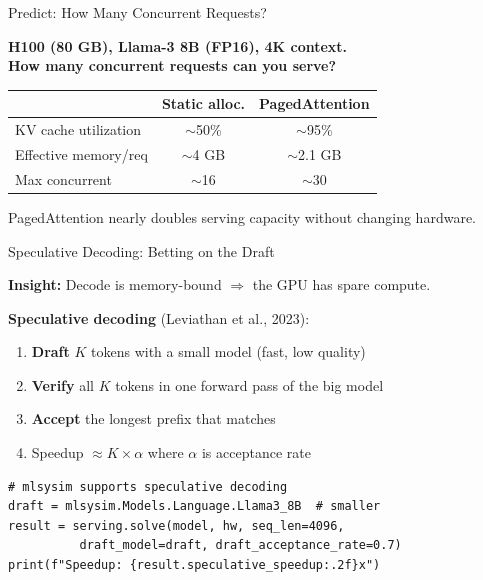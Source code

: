 \documentclass[aspectratio=169, 12pt]{beamer}
\begin{document}
\begin{frame}{Predict: How Many Concurrent Requests?}

\centering
\Large\bfseries
H100 (80 GB), Llama-3 8B (FP16), 4K context.\\[0.5cm]
\normalsize
How many concurrent requests can you serve?\\[0.3cm]

\pause

\small
\begin{tabular}{lcc}
\toprule
  & \textbf{Static alloc.} & \textbf{PagedAttention} \\
\midrule
KV cache utilization & $\sim$50\% & $\sim$95\% \\
Effective memory/req & $\sim$4 GB & $\sim$2.1 GB \\
Max concurrent & $\sim$16 & $\sim$30 \\
\bottomrule
\end{tabular}

\vspace{0.3cm}
\pause
\alert{PagedAttention nearly doubles serving capacity without changing hardware.}
\end{frame}

\begin{frame}[fragile]{Speculative Decoding: Betting on the Draft}

\small
\textbf{Insight:} Decode is memory-bound $\Rightarrow$ the GPU has spare compute.

\textbf{Speculative decoding} (Leviathan et al., 2023):
\begin{enumerate}\setlength\itemsep{2pt}
  \item \textbf{Draft} $K$ tokens with a small model (fast, low quality)
  \item \textbf{Verify} all $K$ tokens in one forward pass of the big model
  \item \textbf{Accept} the longest prefix that matches
  \item Speedup $\approx K \times \alpha$ where $\alpha$ is acceptance rate
\end{enumerate}

\vspace{0.2cm}
\begin{lstlisting}
# mlsysim supports speculative decoding
draft = mlsysim.Models.Language.Llama3_8B  # smaller
result = serving.solve(model, hw, seq_len=4096,
          draft_model=draft, draft_acceptance_rate=0.7)
print(f"Speedup: {result.speculative_speedup:.2f}x")
\end{lstlisting}
\end{frame}
\end{document}
